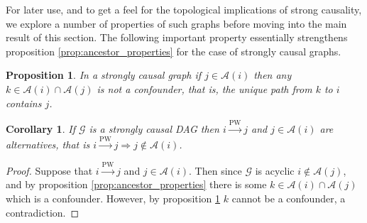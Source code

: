 \documentclass{statsoc}
\def\pwgc{\overset{\text{PW}}{\rightarrow}}  %
\def\gcg{\mathcal{G}}  %
\newcommand{\anc}[1]{\mathcal{A}(#1)}  %
\newcommand{\gcgpath}[2]{#1 \rightarrow \cdots \rightarrow #2}  %
\newtheorem{corollary}{Corollary}
\newtheorem{proposition}{Proposition}
\begin{document}
For later use, and to get a feel for the topological implications of
strong causality, we explore a number of properties of such graphs
before moving into the main result of this section.  The following
important property essentially strengthens proposition
\ref{prop:ancestor_properties} for the case of strongly causal graphs.

\begin{proposition}
  \label{prop:sc_graph_common_anc}
  In a strongly causal graph if $j \in \anc{i}$ then any
  $k \in \anc{i} \cap \anc{j}$ is not a confounder, that is,
  the unique path from $k$ to $i$ contains $j$.
\end{proposition}

\begin{corollary}
  \label{cor:parent_corollary}
  If $\gcg$ is a strongly causal DAG then $i \pwgc j$ and $j \in \anc{i}$ are
  \textit{alternatives}, that is $i \pwgc j \Rightarrow j \notin \anc{i}$.
\end{corollary}
\begin{proof}
  Suppose that $i \pwgc j$ and $j \in \anc{i}$.  Then since $\gcg$ is
  acyclic $i \not\in \anc{j}$, and by proposition
  \ref{prop:ancestor_properties} there is some
  $k \in \anc{i}\cap\anc{j}$ which is a confounder.  However, by
  proposition \ref{prop:sc_graph_common_anc} $k$ cannot be a
  confounder, a contradiction.
\end{proof}



  
\end{document}
